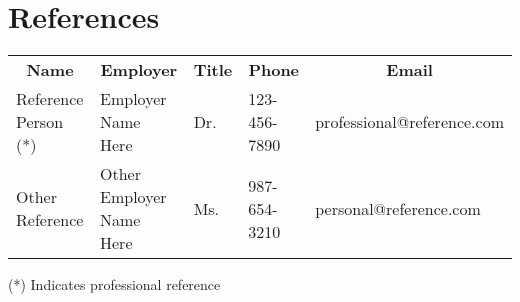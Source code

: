 
\setlength{\tabcolsep}{\oldtabcolsep} %
\section{References}
\begin{table}[htb!]
\centering
\begin{adjustbox}{width=1\textwidth} %
\begin{tabular}{lllll}
\multicolumn{1}{c}{\textbf{Name}} & \multicolumn{1}{c}{\textbf{Employer}} & \multicolumn{1}{c}{\textbf{Title}} & \multicolumn{1}{c}{\textbf{Phone}} & \multicolumn{1}{c}{\textbf{Email}} \\
Reference Person (*) & Employer Name Here & Dr. & 123-456-7890 & professional@reference.com \\ %
Other Reference & Other Employer Name Here & Ms. & 987-654-3210 & personal@reference.com \\ %
\end{tabular}
\end{adjustbox}
\end{table}
(*) Indicates professional reference
\setlength{\tabcolsep}{0pt} %